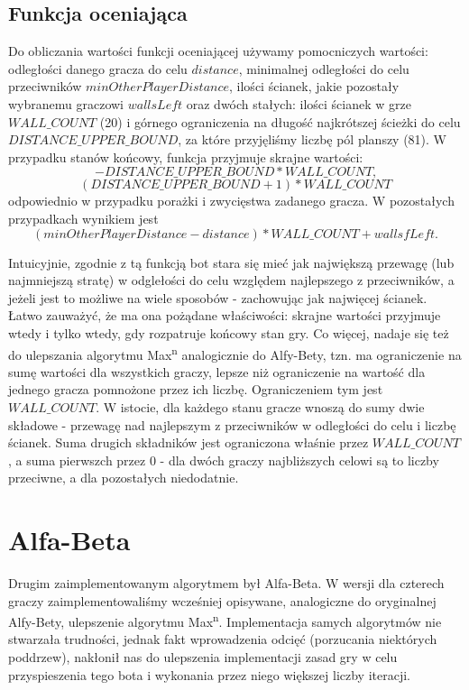 \documentclass{pracamgr}
\begin{document}
\subsection{Funkcja oceniająca}

Do obliczania wartości funkcji oceniającej używamy pomocniczych wartości: odległości danego gracza do celu \(distance\), minimalnej odległości do celu przeciwników \(minOtherPlayerDistance\), ilości ścianek, jakie pozostały wybranemu graczowi \(wallsLeft\) oraz dwóch stałych: ilości ścianek w grze \(WALL\_COUNT\) (20) i górnego ograniczenia na długość najkrótszej ścieżki do celu \(DISTANCE\_UPPER\_BOUND\), za które przyjęliśmy liczbę pól planszy (81).
W przypadku stanów końcowy, funkcja przyjmuje skrajne wartości: \[-DISTANCE\_UPPER\_BOUND * WALL\_COUNT \text{,}\] \[(DISTANCE\_UPPER\_BOUND + 1) * WALL\_COUNT\] odpowiednio w przypadku porażki i zwycięstwa zadanego gracza.
W pozostałych przypadkach wynikiem jest \[(minOtherPlayerDistance - distance) * WALL\_COUNT + wallsfLeft \text{.}\]

Intuicyjnie, zgodnie z tą funkcją bot stara się mieć jak największą przewagę (lub najmniejszą stratę) w odglełości do celu względem najlepszego z przeciwników, a jeżeli jest to możliwe na wiele sposobów - zachowując jak najwięcej ścianek.
Łatwo zauważyć, że ma ona pożądane właściwości: skrajne wartości przyjmuje wtedy i tylko wtedy, gdy rozpatruje końcowy stan gry.
Co więcej, nadaje się też do ulepszania algorytmu Max\textsuperscript{n} analogicznie do Alfy-Bety, tzn. ma ograniczenie na sumę wartości dla wszystkich graczy, lepsze niż ograniczenie na wartość dla jednego gracza pomnożone przez ich liczbę.
Ograniczeniem tym jest \(WALL\_COUNT\).
W istocie, dla każdego stanu gracze wnoszą do sumy dwie składowe - przewagę nad najlepszym z przeciwników w odległości do celu i liczbę ścianek.
Suma drugich składników jest ograniczona właśnie przez \(WALL\_COUNT\), a suma pierwszch przez \(0\) - dla dwóch graczy najbliższych celowi są to liczby przeciwne, a dla pozostałych niedodatnie.

\section {Alfa-Beta}

Drugim zaimplementowanym algorytmem był Alfa-Beta.
W wersji dla czterech graczy zaimplementowaliśmy wcześniej opisywane, analogiczne do oryginalnej Alfy-Bety, ulepszenie algorytmu Max\textsuperscript{n}.
Implementacja samych algorytmów nie stwarzała trudności, jednak fakt wprowadzenia odcięć (porzucania niektórych poddrzew), nakłonił nas do ulepszenia implementacji zasad gry w celu przyspieszenia tego bota i wykonania przez niego większej liczby iteracji.
\end{document}
